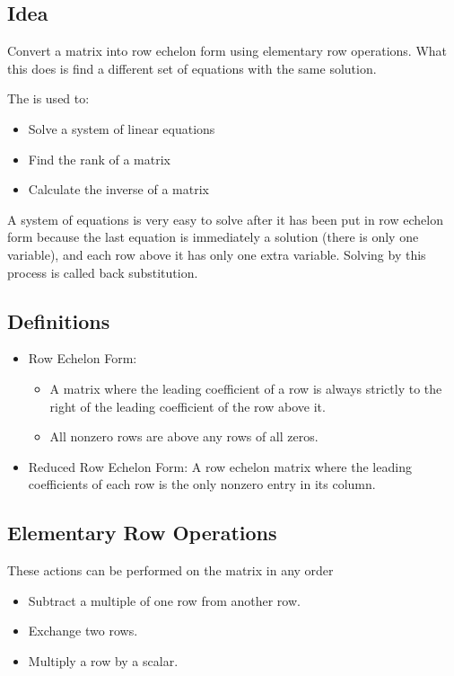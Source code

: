 \documentclass[12pt]{article}
\begin{document}
\subsection{Idea}
Convert a matrix into row echelon form using elementary row operations. What this does is find a different set of equations with the same solution.

The is used to:

\begin{itemize}
\item Solve a system of linear equations
\item Find the rank of a matrix
\item Calculate the inverse of a matrix
\end{itemize}

A system of equations is very easy to solve after it has been put in row echelon form because the last equation is immediately a solution (there is only one variable), and each row above it has only one extra variable.  Solving by this process is called back substitution.

\subsection{Definitions}
\begin{itemize}
\item Row Echelon Form:
	\begin{itemize}
	\item A matrix where the leading coefficient of a row is always strictly to the right of the leading coefficient of the row above it.
	\item All nonzero rows are above any rows of all zeros.
	\end{itemize}
\item Reduced Row Echelon Form: A row echelon matrix where the leading coefficients of each row is the only nonzero entry in its column.
\end{itemize}


\subsection{Elementary Row Operations}
These actions can be performed on the matrix in any order
\begin{itemize}
\item Subtract a multiple of one row from another row.
\item Exchange two rows.
\item Multiply a row by a scalar.
\end{itemize}
\end{document}
